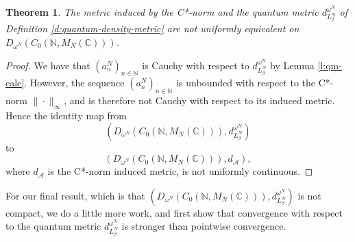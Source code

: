 \documentclass{amsart}
\theoremstyle{plain}
\newtheorem{theorem}{Theorem}[section]
\theoremstyle{definition}
\theoremstyle{remark}
\numberwithin{equation}{section}
\newcommand{\A}{{\mathcal{A}}}
\newcommand{\be}{{\beta}}
\newcommand{\om}{{\omega}}
\newcommand{\N}{{\mathds{N}}}
\newcommand{\C}{{\mathds{C}}}
\begin{document}
\begin{theorem}
    The metric induced by the C*-norm and the  quantum metric $d_{L^N_\be}^{\om^N}$ of Definition \ref{d:quantum-density-metric} are not uniformly equivalent on $D_{\om^N}(C_0(\N, M_N(\C)))$.
\end{theorem}
\begin{proof}
    We have that $(a^N_n)_{n\in \N}$ is   Cauchy with respect to $d_{L^N_\be}^{\om^N}$ by Lemma \ref{l:qm-calc}. However, the sequence $(a^N_n)_{n\in \N}$ is unbounded with respect to the C*-norm $\|\cdot\|_\infty$, and is therefore not Cauchy with respect to its induced metric.  Hence the identity map from \[(D_{\om^N}(C_0(\N, M_N(\C))),d_{L^N_\be}^{\om^N}) \] to  \[(D_{\om^N}(C_0(\N, M_N(\C))), d_\A),\] where $d_\A$ is the C*-norm induced metric, is not uniformly continuous.
\end{proof}


For our final result, which is that $(D_{\om^N}(C_0(\N, M_N(\C))),d_{L^N_\be}^{\om^N})$ is not compact, we do a little more work, and first show that convergence with respect to the quantum metric $d_{L^N_\be}^{\om^N}$ is stronger than pointwise convergence.
\end{document}
